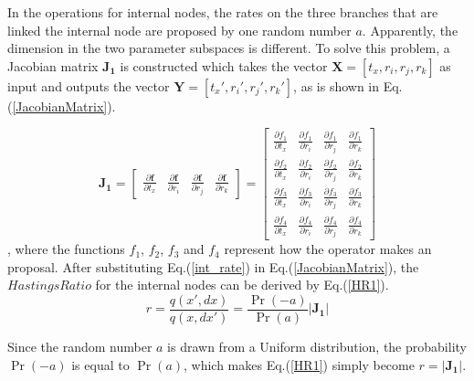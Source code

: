 \documentclass{bmcart}
\begin{document}
In the operations for internal nodes, the rates on the three branches that are linked the internal node are proposed by one random number $a$. Apparently, the dimension in the two parameter subspaces is different. To solve this problem, a Jacobian matrix ${\mathbf{J_1}}$  is constructed which takes the vector ${\mathbf{X}} = [{t_x},{r_i},{r_j},{r_k}]$ as input and outputs the vector ${\mathbf{Y}} = [{t_x}',{r_i}',{r_j}',{r_k}']$, as is shown in Eq.(\ref{JacobianMatrix}).

\begin{equation}\label{JacobianMatrix}
{\mathbf{J_1}} = \left[ {\begin{array}{*{20}{c}}
  {\frac{{\partial {\mathbf{f}}}}{{\partial {t_x}}}}&{\frac{{\partial {\mathbf{f}}}}{{\partial {r_i}}}}&{\frac{{\partial {\mathbf{f}}}}{{\partial {r_j}}}}&{\frac{{\partial {\mathbf{f}}}}{{\partial {r_k}}}}
\end{array}} \right] = \left[ {\begin{array}{*{20}{c}}
  {\frac{{\partial {f_1}}}{{\partial {t_x}}}}&{\frac{{\partial {f_1}}}{{\partial {r_i}}}}&{\frac{{\partial {f_1}}}{{\partial {r_j}}}}&{\frac{{\partial {f_1}}}{{\partial {r_k}}}} \\
  {\frac{{\partial {f_2}}}{{\partial {t_x}}}}&{\frac{{\partial {f_2}}}{{\partial {r_i}}}}&{\frac{{\partial {f_2}}}{{\partial {r_j}}}}&{\frac{{\partial {f_2}}}{{\partial {r_k}}}} \\
  {\frac{{\partial {f_3}}}{{\partial {t_x}}}}&{\frac{{\partial {f_3}}}{{\partial {r_i}}}}&{\frac{{\partial {f_3}}}{{\partial {r_j}}}}&{\frac{{\partial {f_3}}}{{\partial {r_k}}}} \\
  {\frac{{\partial {f_4}}}{{\partial {t_x}}}}&{\frac{{\partial {f_4}}}{{\partial {r_i}}}}&{\frac{{\partial {f_4}}}{{\partial {r_j}}}}&{\frac{{\partial {f_4}}}{{\partial {r_k}}}}
\end{array}} \right]
\end{equation}
, where the functions ${f_1}$, ${f_2}$, ${f_3}$ and ${f_4}$ represent how the operator makes an proposal. After substituting Eq.(\ref{int_rate}) in Eq.(\ref{JacobianMatrix}), the $HastingsRatio$ for the internal nodes can be derived by Eq.(\ref{HR1}).
\begin{equation}\label{HR1}
r = \frac{{q(x',dx)}}{{q(x,dx')}} = \frac{{\Pr ( - a)}}{{\Pr (a)}}\left| {\mathbf{J_1}} \right|
\end{equation}

Since the random number $a$ is drawn from a Uniform distribution, the probability ${\Pr ( - a)}$ is equal to ${\Pr ( a )}$, which makes Eq.(\ref{HR1}) simply become $r = \left| {\mathbf{J_1}} \right|$.
\end{document}
